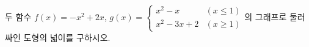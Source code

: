 두 함수 $f(x)=-x^2+2x$, $g(x)=\begin{cases} x^2-x & (x\le 1) \\ x^2-3x+2 & (x\ge 1) \end{cases}$의 그래프로 둘러싸인 도형의 넓이를 구하시오.
